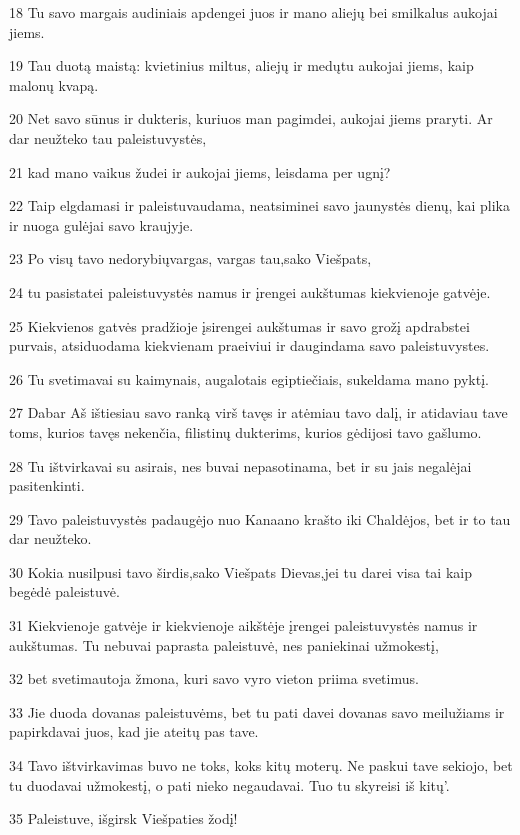 \par 18 Tu savo margais audiniais apdengei juos ir mano aliejų bei smilkalus aukojai jiems. 
\par 19 Tau duotą maistą: kvietinius miltus, aliejų ir medų­tu aukojai jiems, kaip malonų kvapą. 
\par 20 Net savo sūnus ir dukteris, kuriuos man pagimdei, aukojai jiems praryti. Ar dar neužteko tau paleistuvystės, 
\par 21 kad mano vaikus žudei ir aukojai jiems, leisdama per ugnį? 
\par 22 Taip elgdamasi ir paleistuvaudama, neatsiminei savo jaunystės dienų, kai plika ir nuoga gulėjai savo kraujyje. 
\par 23 Po visų tavo nedorybių­vargas, vargas tau,­sako Viešpats,­ 
\par 24 tu pasistatei paleistuvystės namus ir įrengei aukštumas kiekvienoje gatvėje. 
\par 25 Kiekvienos gatvės pradžioje įsirengei aukštumas ir savo grožį apdrabstei purvais, atsiduodama kiekvienam praeiviui ir daugindama savo paleistuvystes. 
\par 26 Tu svetimavai su kaimynais, augalotais egiptiečiais, sukeldama mano pyktį. 
\par 27 Dabar Aš ištiesiau savo ranką virš tavęs ir atėmiau tavo dalį, ir atidaviau tave toms, kurios tavęs nekenčia, filistinų dukterims, kurios gėdijosi tavo gašlumo. 
\par 28 Tu ištvirkavai su asirais, nes buvai nepasotinama, bet ir su jais negalėjai pasitenkinti. 
\par 29 Tavo paleistuvystės padaugėjo nuo Kanaano krašto iki Chaldėjos, bet ir to tau dar neužteko. 
\par 30 Kokia nusilpusi tavo širdis,­sako Viešpats Dievas,­jei tu darei visa tai kaip begėdė paleistuvė. 
\par 31 Kiekvienoje gatvėje ir kiekvienoje aikštėje įrengei paleistuvystės namus ir aukštumas. Tu nebuvai paprasta paleistuvė, nes paniekinai užmokestį, 
\par 32 bet svetimautoja žmona, kuri savo vyro vieton priima svetimus. 
\par 33 Jie duoda dovanas paleistuvėms, bet tu pati davei dovanas savo meilužiams ir papirkdavai juos, kad jie ateitų pas tave. 
\par 34 Tavo ištvirkavimas buvo ne toks, koks kitų moterų. Ne paskui tave sekiojo, bet tu duodavai užmokestį, o pati nieko negaudavai. Tuo tu skyreisi iš kitų’. 
\par 35 Paleistuve, išgirsk Viešpaties žodį! 
